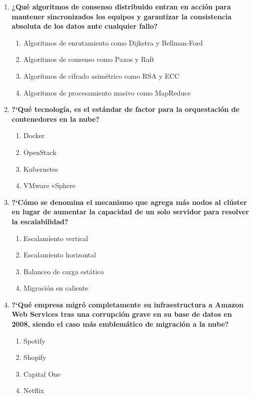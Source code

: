 \documentclass[12pt,letterpaper]{article}
\begin{document}
\begin{enumerate}[label=\textbf{\arabic*.}, leftmargin=1.5em, itemsep=0.8cm]

    \item \textbf{¿Qué algoritmos de consenso distribuido entran en acción para mantener sincronizados los equipos y garantizar la consistencia absoluta de los datos ante cualquier fallo?}
    \begin{enumerate}[label=\alph*), nosep]
        \item Algoritmos de enrutamiento como Dijkstra y Bellman-Ford
        \item Algoritmos de consenso como Paxos y Raft
        \item Algoritmos de cifrado asimétrico como RSA y ECC
        \item Algoritmos de procesamiento masivo como MapReduce
    \end{enumerate}

    \item \textbf{?`Qu\'e tecnolog\'ia, es el est\'andar de factor para la orquestaci\'on de contenedores en la nube?}

    \begin{enumerate}[label=\alph*), nosep]
        \item Docker
        \item OpenStack
        \item Kubernetes
        \item VMware vSphere
    \end{enumerate}

    \item \textbf{?`C\'omo se denomina el mecanismo que agrega m\'as nodos al cl\'uster en lugar de aumentar la capacidad de un solo servidor para resolver la escalabilidad?}

    \begin{enumerate}[label=\alph*), nosep]
        \item Escalamiento vertical
        \item Escalamiento horizontal
        \item Balanceo de carga est\'atico
        \item Migraci\'on en caliente
    \end{enumerate}

    \item \textbf{?`Qu\'e empresa migr\'o completamente su infraestructura a Amazon Web Services tras una corrupci\'on grave en su base de datos en 2008, siendo el caso m\'as emblem\'atico de migraci\'on a la nube?}

    \begin{enumerate}[label=\alph*), nosep]
        \item Spotify
        \item Shopify
        \item Capital One
        \item Netflix
    \end{enumerate}

\end{enumerate}
\end{document}
